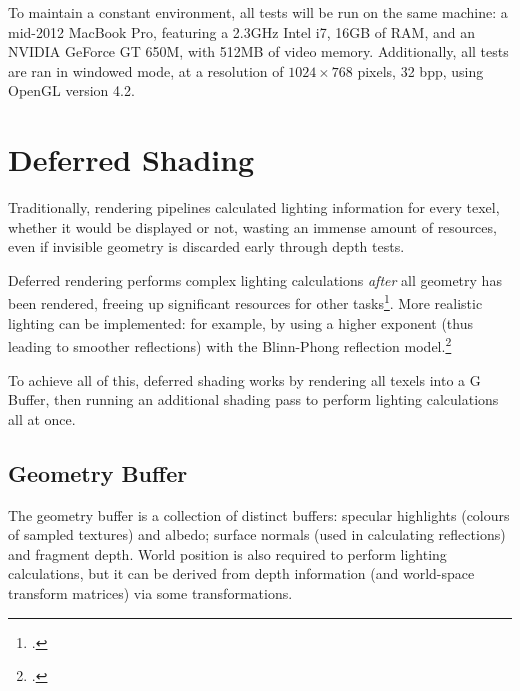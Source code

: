 \documentclass[11pt, oneside]{report}
\begin{document}
To maintain a constant environment, all tests will be run on the same machine: a mid-2012 MacBook Pro, featuring a 2.3GHz Intel i7, 16GB of RAM, and an NVIDIA GeForce GT 650M, with 512MB of video memory. Additionally, all tests are ran in windowed mode, at a resolution of $1024 \times 768$ pixels, 32 \gls{bpp}, using \gls{OpenGL} version 4.2.

\chapter{Deferred Shading}
Traditionally, rendering pipelines calculated lighting information for every \gls{texel}, whether it would be displayed or not, wasting an immense amount of resources, even if invisible geometry is discarded early through \glspl{depth test}.

Deferred rendering performs complex lighting calculations \textit{after} all geometry has been rendered, freeing up significant resources for other tasks\footcite{gpupro-deferred}. More realistic lighting can be implemented: for example, by using a higher exponent (thus leading to smoother reflections) with the \gls{Blinn-Phong reflection model}.\footcite{ferko-deferred}

To achieve all of this, deferred shading works by rendering all texels into a \gls{G Buffer}, then running an additional shading pass to perform lighting calculations all at once.

\section{Geometry Buffer}
The geometry buffer is a collection of distinct buffers: \gls{specular} highlights (colours of sampled textures) and albedo; surface normals (used in calculating reflections) and fragment depth. World position is also required to perform lighting calculations, but it can be derived from depth information (and world-space transform matrices) via some transformations.
\end{document}
